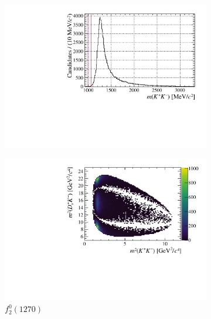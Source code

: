 \begin{figure}[!ht]
    \begin{subfigure}[t]{0.32\textwidth}    
        \centering 
        \includegraphics[width=1.0\textwidth]{figs/B2DsPhi/f2_phi_mass.pdf}
    \end{subfigure}
    \begin{subfigure}[t]{0.32\textwidth}    
        \centering 
        \includegraphics[width=1.0\textwidth]{figs/B2DsPhi/f2_Dalitz_plot.pdf}
        \caption{$f_{2}^{0}(1270)$}
    \end{subfigure}
    \begin{subfigure}[t]{0.32\textwidth}    
        \centering 

\end{subfigure}
\end{figure}
